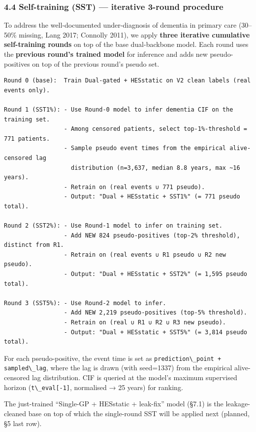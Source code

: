 \documentclass[
  11pt,
]{article}
\newcommand{\passthrough}[1]{#1}
\begin{document}
\subsubsection{4.4 Self-training (SST) --- iterative 3-round
procedure}\label{self-training-sst-iterative-3-round-procedure}

To address the well-documented under-diagnosis of dementia in primary
care (30--50\% missing, Lang 2017; Connolly 2011), we apply
\textbf{three iterative cumulative self-training rounds} on top of the
base dual-backbone model. Each round uses the \textbf{previous round's
trained model} for inference and adds new pseudo-positives on top of the
previous round's pseudo set.

\begin{lstlisting}
Round 0 (base):  Train Dual-gated + HESstatic on V2 clean labels (real events only).

Round 1 (SST1%): - Use Round-0 model to infer dementia CIF on the training set.
                 - Among censored patients, select top-1%-threshold = 771 patients.
                 - Sample pseudo event times from the empirical alive-censored lag
                   distribution (n=3,637, median 8.8 years, max ~16 years).
                 - Retrain on (real events ∪ 771 pseudo).
                 - Output: "Dual + HESstatic + SST1%" (= 771 pseudo total).

Round 2 (SST2%): - Use Round-1 model to infer on training set.
                 - Add NEW 824 pseudo-positives (top-2% threshold), distinct from R1.
                 - Retrain on (real events ∪ R1 pseudo ∪ R2 new pseudo).
                 - Output: "Dual + HESstatic + SST2%" (= 1,595 pseudo total).

Round 3 (SST5%): - Use Round-2 model to infer.
                 - Add NEW 2,219 pseudo-positives (top-5% threshold).
                 - Retrain on (real ∪ R1 ∪ R2 ∪ R3 new pseudo).
                 - Output: "Dual + HESstatic + SST5%" (= 3,814 pseudo total).
\end{lstlisting}

For each pseudo-positive, the event time is set as
\passthrough{\lstinline!prediction\_point + sampled\_lag!}, where the
lag is drawn (with seed=1337) from the empirical alive-censored lag
distribution. CIF is queried at the model's maximum supervised horizon
(\passthrough{\lstinline!t\_eval[-1]!}, normalised → 25 years) for
ranking.

The just-trained ``Single-GP + HESstatic + leak-fix'' model (§7.1) is
the leakage-cleaned base on top of which the single-round SST will be
applied next (planned, §5 last row).
\end{document}
